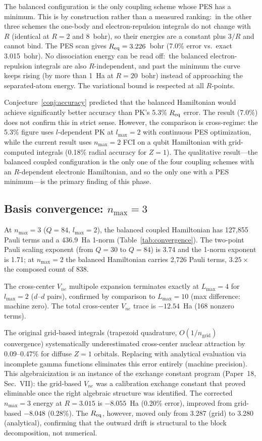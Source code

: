 \documentclass[aps,pra,twocolumn,superscriptaddress,longbibliography]{revtex4-2}
\begin{document}
The balanced configuration is the only coupling scheme whose PES has a
minimum.  This is by construction rather than a measured ranking:\ in
the other three schemes the one-body and electron-repulsion integrals do
not change with $R$ (identical at $R = 2$ and $8$~bohr), so their
energies are a constant plus $3/R$ and cannot bind.  The PES scan gives
$R_{\rm eq} = 3.226$~bohr (7.0\% error vs.\ exact 3.015~bohr).  No
dissociation energy can be read off:\ the balanced electron-repulsion
integrals are also $R$-independent, and past the minimum the curve keeps
rising (by more than 1~Ha at $R = 20$~bohr) instead of approaching the
separated-atom energy.  The variational bound is respected at all
$R$-points.

Conjecture~\ref{conj:accuracy} predicted that the balanced Hamiltonian
would achieve significantly better accuracy than PK's 5.3\%
$R_{\rm eq}$ error.  The result (7.0\%) does not confirm this in strict
sense.  However, the comparison is cross-regime: the 5.3\% figure
uses $l$-dependent PK at $l_{\max} = 2$ with continuous PES optimization,
while the current result uses $n_{\max} = 2$ FCI on a qubit Hamiltonian
with grid-computed integrals (0.18\% radial accuracy for $Z = 1$).
The qualitative result---the balanced coupled configuration is the
only one of the four coupling schemes with an $R$-dependent electronic
Hamiltonian, and so the only one with a PES minimum---is the
primary finding of this phase.

\subsection{Basis convergence: $n_{\max} = 3$}

At $n_{\max} = 3$ ($Q = 84$, $l_{\max} = 2$), the balanced coupled
Hamiltonian has 127{,}855 Pauli terms and a 436.9~Ha 1-norm
(Table~\ref{tab:convergence}).  The two-point Pauli scaling exponent
(from $Q = 30$ to $Q = 84$) is 3.74 and the 1-norm exponent is 1.71;
at $n_{\max} = 2$ the balanced Hamiltonian carries 2{,}726 Pauli terms,
$3.25\times$ the composed count of 838.

The cross-center $V_{ne}$ multipole expansion terminates exactly at
$L_{\max} = 4$ for $l_{\max} = 2$ ($d$--$d$ pairs), confirmed by
comparison to $L_{\max} = 10$ (max difference: machine zero).  The
total cross-center $V_{ne}$ trace is $-12.54$~Ha (168 nonzero terms).

The original grid-based integrals (trapezoid quadrature,
$O(1/n_{\mathrm{grid}})$ convergence) systematically underestimated
cross-center nuclear attraction by 0.09--0.47\% for diffuse $Z = 1$
orbitals.  Replacing with analytical evaluation via incomplete gamma
functions eliminates this error entirely (machine precision).  This
algebraicization is an instance of the exchange constant program
(Paper~18, Sec.~VII): the grid-based $V_{ne}$ was a calibration
exchange constant that proved eliminable once the right algebraic
structure was identified.  The
corrected $n_{\max} = 3$ energy at $R = 3.015$ is $-8.055$~Ha (0.20\%
error), improved from grid-based $-8.048$ (0.28\%).  The $R_{\rm eq}$,
however, moved only from 3.287 (grid) to 3.280 (analytical), confirming
that the outward drift is structural to the block decomposition, not
numerical.
\end{document}
